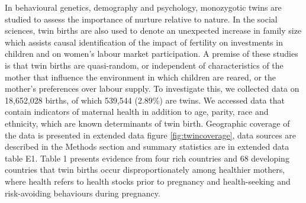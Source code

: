 \documentclass{nature}
\begin{document}
\begin{linenumbers}
In behavioural genetics, demography and psychology, monozygotic twins are studied to assess the importance of nurture relative to nature\cite{Thorndike1905,Boomsmaetal2002,Poldermanetal2015,Phillips1993,BouchardPropping1993,McClearnetal1997,Nisen2013}. In the social sciences, twin births are also used to denote an unexpected increase in family size which assists causal identification of the impact of fertility on investments in children and on women's labour market participation\cite{WolpinRosenzweig2000,RosenzweigWolpin1980,BronarsGrogger1994}.
A premise of these studies is that twin births are quasi-random, or independent of characteristics of the mother that influence the environment in which children are reared, or the mother's preferences over labour supply.
To investigate this, we collected data on 18,652,028 births, of which 539,544 (2.89\%) are twins. We accessed data that contain indicators of maternal health in addition to age, parity, race and ethnicity, which are known determinants of twin birth\cite{Bulmer1970}. Geographic coverage of the data is presented in extended data figure \ref{fig:twincoverage}, data sources are described in the Methods section and summary statistics are in extended data table E1. Table 1 presents evidence from four rich countries and 68 developing countries that twin births occur disproportionately among healthier mothers, where health refers to health stocks prior to pregnancy and health-seeking and risk-avoiding behaviours during pregnancy. %




\end{linenumbers}
\end{document}
